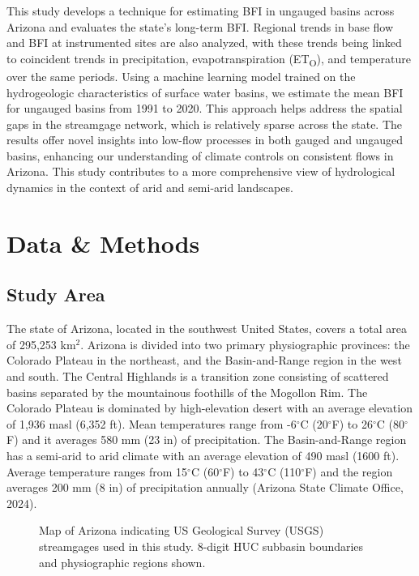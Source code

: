 \documentclass[
]{agujournal2019}
\begin{document}
This study develops a technique for estimating BFI in ungauged basins
across Arizona and evaluates the state's long-term BFI. Regional trends
in base flow and BFI at instrumented sites are also analyzed, with these
trends being linked to coincident trends in precipitation,
evapotranspiration (ET\textsubscript{O}), and temperature over the same
periods. Using a machine learning model trained on the hydrogeologic
characteristics of surface water basins, we estimate the mean BFI for
ungauged basins from 1991 to 2020. This approach helps address the
spatial gaps in the streamgage network, which is relatively sparse
across the state. The results offer novel insights into low-flow
processes in both gauged and ungauged basins, enhancing our
understanding of climate controls on consistent flows in Arizona. This
study contributes to a more comprehensive view of hydrological dynamics
in the context of arid and semi-arid landscapes.

\section{Data \& Methods}\label{sec-data-methods}

\subsection{Study Area}\label{sec-study-area}

The state of Arizona, located in the southwest United States, covers a
total area of 295,253 km\(^2\). Arizona is divided into two primary
physiographic provinces: the Colorado Plateau in the northeast, and the
Basin-and-Range region in the west and south. The Central Highlands is a
transition zone consisting of scattered basins separated by the
mountainous foothills of the Mogollon Rim. The Colorado Plateau is
dominated by high-elevation desert with an average elevation of 1,936
masl (6,352 ft). Mean temperatures range from -6\(^\circ\)C
(20\(^\circ\)F) to 26\(^\circ\)C (80\(^\circ\)F) and it averages 580 mm
(23 in) of precipitation. The Basin-and-Range region has a semi-arid to
arid climate with an average elevation of 490 masl (1600 ft). Average
temperature ranges from 15\(^\circ\)C (60\(^\circ\)F) to 43\(^\circ\)C
(110\(^\circ\)F) and the region averages 200 mm (8 in) of precipitation
annually (Arizona State Climate Office, 2024).

\begin{figure}


\caption{\label{fig-study-area}Map of Arizona indicating US Geological
Survey (USGS) streamgages used in this study. 8-digit HUC subbasin
boundaries and physiographic regions shown.}

\end{figure}%
\end{document}
